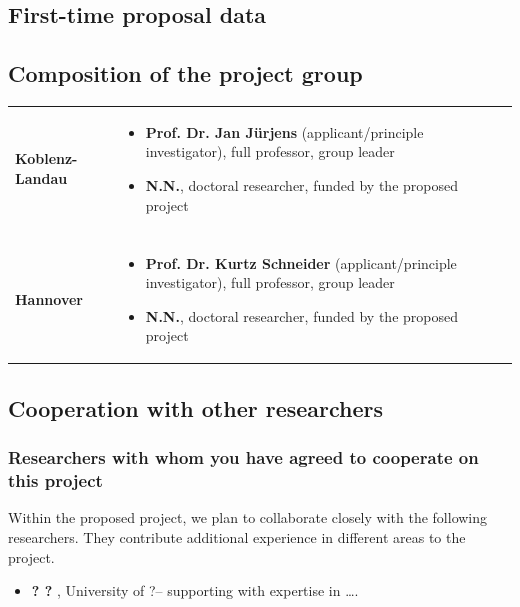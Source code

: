 \documentclass{dfg_en}
\begin{document}
\subsection{First-time proposal data}
%

\subsection{Composition of the project group}
\vspace{-5pt}
\noindent\begin{tabularx}{\textwidth}{lX}
	{\bf Koblenz-Landau}  & \vspace{-0.68cm}\begin{itemize} \setlength\itemsep{-0.4em}
		\item \textbf{Prof. Dr. Jan Jürjens} (applicant/principle investigator), full professor, group leader
		\item \textbf{N.N.}, doctoral researcher, funded by the proposed project\vspace{-0.6cm}
	\end{itemize} \\
	\\
	{\bf Hannover} & \vspace{-0.68cm}\begin{itemize} \setlength\itemsep{-0.4em}
		\item \textbf{Prof. Dr. Kurtz Schneider} (applicant/principle investigator), full professor, group leader
		\item \textbf{N.N.}, doctoral researcher, funded by the proposed project\vspace{-0.6cm}
	\end{itemize}
\end{tabularx}

\subsection{Cooperation with other researchers}

\subsubsection{Researchers with whom you have agreed to cooperate on this project}
Within the proposed project, we plan to collaborate closely with the following researchers. They contribute additional experience in different areas to the project. 
\vspace{-5pt}
\begin{itemize}\setlength\itemsep{-0.4em}
	\item \textbf{? ? }, University of ?-- supporting with expertise in \ldots.
\end{itemize}
%
\end{document}
